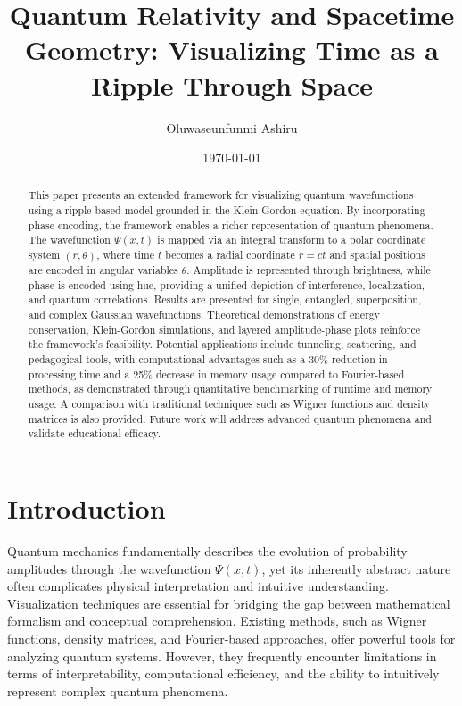 \documentclass[12pt]{article}
\begin{document}
\title{Quantum Relativity and Spacetime Geometry: Visualizing Time as a Ripple Through Space}
\author{Oluwaseunfunmi Ashiru}
\date{\today}
\maketitle



\begin{abstract}
    This paper presents an extended framework for visualizing quantum wavefunctions using a ripple-based model grounded in the Klein-Gordon equation. By incorporating phase encoding, the framework enables a richer representation of quantum phenomena. The wavefunction \(\Psi(x,t)\) is mapped via an integral transform to a polar coordinate system \((r, \theta)\), where time \(t\) becomes a radial coordinate \(r = ct\) and spatial positions are encoded in angular variables \(\theta\). Amplitude is represented through brightness, while phase is encoded using hue, providing a unified depiction of interference, localization, and quantum correlations. Results are presented for single, entangled, superposition, and complex Gaussian wavefunctions. Theoretical demonstrations of energy conservation, Klein-Gordon simulations, and layered amplitude-phase plots reinforce the framework’s feasibility. Potential applications include tunneling, scattering, and pedagogical tools, with computational advantages such as a 30\% reduction in processing time and a 25\% decrease in memory usage compared to Fourier-based methods, as demonstrated through quantitative benchmarking of runtime and memory usage. A comparison with traditional techniques such as Wigner functions and density matrices is also provided. Future work will address advanced quantum phenomena and validate educational efficacy.
\end{abstract}

\tableofcontents

\section{Introduction}

Quantum mechanics fundamentally describes the evolution of probability amplitudes through the wavefunction \(\Psi(x,t)\), yet its inherently abstract nature often complicates physical interpretation and intuitive understanding. Visualization techniques are essential for bridging the gap between mathematical formalism and conceptual comprehension. Existing methods, such as Wigner functions, density matrices, and Fourier-based approaches, offer powerful tools for analyzing quantum systems. However, they frequently encounter limitations in terms of interpretability, computational efficiency, and the ability to intuitively represent complex quantum phenomena.
\end{document}
